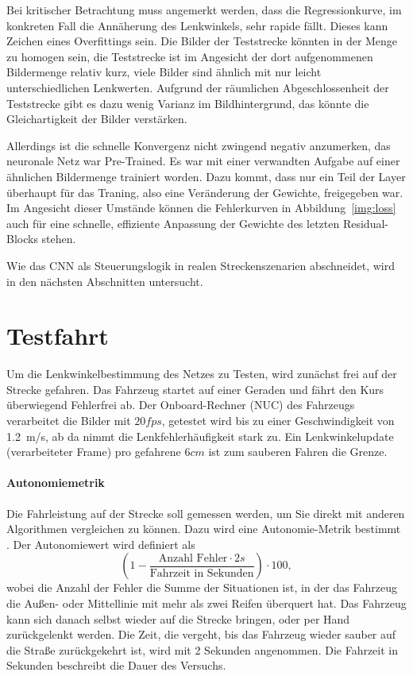 Bei kritischer Betrachtung muss angemerkt werden, dass die Regressionkurve, im konkreten Fall die Annäherung des Lenkwinkels, sehr rapide fällt.  Dieses kann Zeichen eines Overfittings sein. Die Bilder der Teststrecke könnten in der Menge zu homogen sein, die Teststrecke ist im Angesicht der dort aufgenommenen Bildermenge relativ kurz, viele Bilder sind ähnlich mit nur leicht unterschiedlichen Lenkwerten. Aufgrund der räumlichen Abgeschlossenheit der Teststrecke gibt es dazu wenig Varianz im Bildhintergrund, das könnte die Gleichartigkeit der Bilder verstärken.

Allerdings ist die schnelle Konvergenz nicht zwingend negativ anzumerken, das neuronale Netz war Pre-Trained. Es war mit einer verwandten Aufgabe auf einer ähnlichen Bildermenge trainiert worden. Dazu kommt, dass nur ein Teil der Layer überhaupt für das Traning, also eine Veränderung der Gewichte, freigegeben war. Im Angesicht dieser Umstände können die Fehlerkurven in Abbildung~\ref{img:loss} auch für eine schnelle, effiziente Anpassung der Gewichte des letzten Residual-Blocks stehen.

Wie das CNN als Steuerungslogik in realen Streckenszenarien abschneidet, wird in den nächsten Abschnitten untersucht.

\section{Testfahrt}

Um die Lenkwinkelbestimmung des Netzes zu Testen, wird zunächst frei auf der Strecke gefahren. Das Fahrzeug startet auf einer Geraden und fährt den Kurs überwiegend Fehlerfrei ab. Der Onboard-Rechner (NUC) des Fahrzeugs verarbeitet die Bilder mit $20 fps$, getestet wird bis zu einer Geschwindigkeit von \SI{1.2}{\meter/\second}, ab da nimmt die Lenkfehlerhäufigkeit stark zu. Ein Lenkwinkelupdate (verarbeiteter Frame) pro gefahrene $6 cm$ ist zum sauberen Fahren die Grenze.\\
\paragraph{Autonomiemetrik}
Die Fahrleistung auf der Strecke soll gemessen werden, um Sie direkt mit anderen Algorithmen vergleichen zu können. Dazu wird eine Autonomie-Metrik bestimmt \cite{bojarski2016end}. Der Autonomiewert wird definiert als 
\begin{equation}
\label{mat:autonomie}
(1 -  \frac{\text{Anzahl Fehler}\cdot 2 s}{\text{Fahrzeit in Sekunden}})\cdot 100,
\end{equation}
wobei die Anzahl der Fehler die Summe der Situationen ist, in der das Fahrzeug die Außen- oder Mittellinie mit mehr als zwei Reifen überquert hat. Das Fahrzeug kann sich danach selbst wieder auf die Strecke bringen, oder per Hand zurückgelenkt werden. Die Zeit, die vergeht, bis das Fahrzeug wieder sauber auf die Straße zurückgekehrt ist, wird mit 2 Sekunden angenommen. Die Fahrzeit in Sekunden beschreibt die Dauer des Versuchs.

